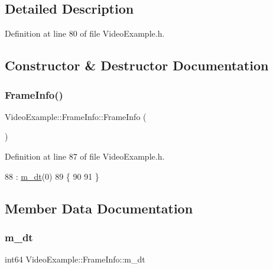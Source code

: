 \subsection{Detailed Description}


Definition at line 80 of file Video\+Example.\+h.



\subsection{Constructor \& Destructor Documentation}
\mbox{\label{struct_video_example_1_1_frame_info_ae128997d5f216c7acec8fa0653481546}} 
\subsubsection{\texorpdfstring{Frame\+Info()}{FrameInfo()}}
{\footnotesize\ttfamily Video\+Example\+::\+Frame\+Info\+::\+Frame\+Info (\begin{DoxyParamCaption}{ }\end{DoxyParamCaption})\hspace{0.3cm}{\ttfamily [inline]}}



Definition at line 87 of file Video\+Example.\+h.


\begin{DoxyCode}
88             : \mbox{\hyperlink{struct_video_example_1_1_frame_info_a1f0a32e6ab3a40b1173f73767523372f}{m\_dt}}(0)
89         \{
90 
91         \}
\end{DoxyCode}


\subsection{Member Data Documentation}
\mbox{\label{struct_video_example_1_1_frame_info_a1f0a32e6ab3a40b1173f73767523372f}} 
\subsubsection{\texorpdfstring{m\+\_\+dt}{m\_dt}}
{\footnotesize\ttfamily int64 Video\+Example\+::\+Frame\+Info\+::m\+\_\+dt}



